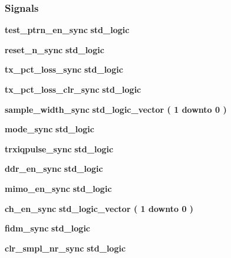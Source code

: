 \subsubsection*{Signals}
 \begin{DoxyCompactItemize}
\item 
{\bf test\+\_\+ptrn\+\_\+en\+\_\+sync} {\bfseries \textcolor{comment}{std\+\_\+logic}\textcolor{vhdlchar}{ }} 
\item 
{\bf reset\+\_\+n\+\_\+sync} {\bfseries \textcolor{comment}{std\+\_\+logic}\textcolor{vhdlchar}{ }} 
\item 
{\bf tx\+\_\+pct\+\_\+loss\+\_\+sync} {\bfseries \textcolor{comment}{std\+\_\+logic}\textcolor{vhdlchar}{ }} 
\item 
{\bf tx\+\_\+pct\+\_\+loss\+\_\+clr\+\_\+sync} {\bfseries \textcolor{comment}{std\+\_\+logic}\textcolor{vhdlchar}{ }} 
\item 
{\bf sample\+\_\+width\+\_\+sync} {\bfseries \textcolor{comment}{std\+\_\+logic\+\_\+vector}\textcolor{vhdlchar}{ }\textcolor{vhdlchar}{(}\textcolor{vhdlchar}{ }\textcolor{vhdlchar}{ } \textcolor{vhdldigit}{1} \textcolor{vhdlchar}{ }\textcolor{keywordflow}{downto}\textcolor{vhdlchar}{ }\textcolor{vhdlchar}{ } \textcolor{vhdldigit}{0} \textcolor{vhdlchar}{ }\textcolor{vhdlchar}{)}\textcolor{vhdlchar}{ }} 
\item 
{\bf mode\+\_\+sync} {\bfseries \textcolor{comment}{std\+\_\+logic}\textcolor{vhdlchar}{ }} 
\item 
{\bf trxiqpulse\+\_\+sync} {\bfseries \textcolor{comment}{std\+\_\+logic}\textcolor{vhdlchar}{ }} 
\item 
{\bf ddr\+\_\+en\+\_\+sync} {\bfseries \textcolor{comment}{std\+\_\+logic}\textcolor{vhdlchar}{ }} 
\item 
{\bf mimo\+\_\+en\+\_\+sync} {\bfseries \textcolor{comment}{std\+\_\+logic}\textcolor{vhdlchar}{ }} 
\item 
{\bf ch\+\_\+en\+\_\+sync} {\bfseries \textcolor{comment}{std\+\_\+logic\+\_\+vector}\textcolor{vhdlchar}{ }\textcolor{vhdlchar}{(}\textcolor{vhdlchar}{ }\textcolor{vhdlchar}{ } \textcolor{vhdldigit}{1} \textcolor{vhdlchar}{ }\textcolor{keywordflow}{downto}\textcolor{vhdlchar}{ }\textcolor{vhdlchar}{ } \textcolor{vhdldigit}{0} \textcolor{vhdlchar}{ }\textcolor{vhdlchar}{)}\textcolor{vhdlchar}{ }} 
\item 
{\bf fidm\+\_\+sync} {\bfseries \textcolor{comment}{std\+\_\+logic}\textcolor{vhdlchar}{ }} 
\item 
{\bf clr\+\_\+smpl\+\_\+nr\+\_\+sync} {\bfseries \textcolor{comment}{std\+\_\+logic}\textcolor{vhdlchar}{ }} 

\end{DoxyCompactItemize}
